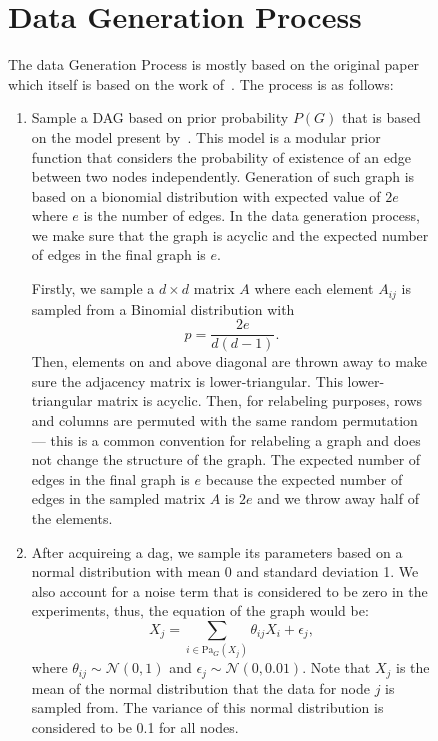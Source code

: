 \documentclass{lxaiproposal}
\begin{document}
\begin{figure}[h]
    \section{Data Generation Process}\label{app:data_generation}
    \vspace*{-3mm}

    The data Generation Process is mostly based on the original paper which itself is based on the work of~\cite{erdos1960evolutionrandomgraphs}.
    The process is as follows:

    \begin{enumerate}
        \item Sample a DAG based on prior probability $P(G)$ that is based on the model present by~\cite{erdos1960evolutionrandomgraphs}.
        This model is a modular prior function that considers the probability of existence of an edge between two
        nodes independently. Generation of such graph is based on a bionomial distribution with expected value of $2e$
        where $e$ is the number of edges. In the data generation process, we make sure that the graph is acyclic and
        the expected number of edges in the final graph is $e$.

        Firstly, we sample a $d \times d$ matrix $A$ where each element $A_{ij}$ is sampled from a Binomial
        distribution with
        \begin{equation}
            p = \frac{2e}{d(d-1)}.
            \label{eq:binomial}
        \end{equation}
        Then, elements on and above diagonal are thrown away to make sure the adjacency matrix is lower-triangular.
        This lower-triangular matrix is acyclic. Then, for relabeling purposes, rows and columns are permuted with
        the same random permutation --- this is a common convention for relabeling a graph and does not change the
        structure of the graph.
        The expected number of edges in the final graph is $e$ because the expected number of edges in the sampled
        matrix $A$ is $2e$ and we throw away half of the elements.

        \item After acquireing a dag, we sample its parameters
        based on a normal distribution with mean 0 and standard deviation 1. We also account for a noise term that
        is considered to be zero in the experiments, thus, the equation of the graph would be:
        \begin{equation}
            X_j = \sum_{i \in \text{Pa}_G(X_j)} \theta_{ij}X_i + \epsilon_j,
            \label{eq:graph}
        \end{equation}
        where $\theta_{ij} \sim \mathcal{N}(0, 1)$ and $\epsilon_j \sim \mathcal{N}(0, 0.01)$. Note that $X_j$ is the
        mean of the normal distribution that the data for node $j$ is sampled from. The variance of this normal
        distribution is considered to be 0.1 for all nodes.


\end{enumerate}
\end{figure}
\end{document}
